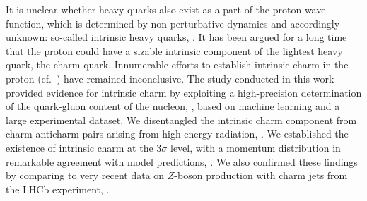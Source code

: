 
It is unclear whether heavy quarks also exist as a part of the proton
wave-function, which is determined by non-perturbative dynamics and accordingly
unknown: so-called intrinsic heavy quarks, \cite{Brodsky:1980pb}.
It has been argued for a long time that the proton could have a sizable
intrinsic component of the lightest  heavy quark, the charm quark. Innumerable
efforts to establish intrinsic charm in the proton (cf.\
\cite{Brodsky:2015fna}) have remained inconclusive.
%
The study conducted in this work provided evidence for intrinsic charm by
exploiting a high-precision determination of the quark-gluon content of the
nucleon, \cite{Ball:2021leu}, based on machine learning and a large
experimental dataset.
%
We disentangled the intrinsic charm component from charm-anticharm pairs
arising from high-energy radiation, \cite{Ball:2015tna}.
We established the existence of intrinsic charm at the  $3\sigma$ level, with a
momentum distribution in remarkable agreement with model predictions,
\cite{Brodsky:1980pb,Hobbs:2013bia}.
%
We also confirmed these findings by comparing to very recent data on $Z$-boson
production with charm jets from the LHCb experiment, \cite{LHCb:2021stx}. 
